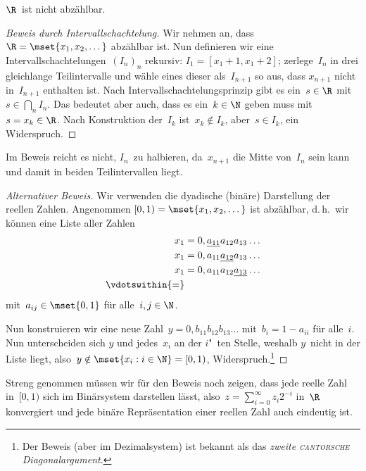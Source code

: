 \documentclass[a4paper]{article}
\begin{document}
\begin{theorem}
    $\R$~ist nicht abzählbar.
\end{theorem}

\begin{proof}[Beweis durch Intervallschachtelung]
    Wir nehmen an, dass~$\R = \mset{x_1, x_2, \dots}$ abzählbar ist. Nun definieren wir eine Intervallschachtelungen~$(I_n)_n$ rekursiv: $I_1 = [x_1+1, x_1+2]$; zerlege~$I_n$ in drei gleichlange Teilintervalle und wähle eines dieser als~$I_{n+1}$ so aus, dass $x_{n+1}$ nicht in~$I_{n+1}$ enthalten ist. Nach Intervallschachtelungsprinzip gibt es ein~$s \in \R$ mit~$s \in \bigcap_n I_n$. Das bedeutet aber auch, dass es ein~$k \in \N$ geben muss mit $s = x_k \in \R$. Nach Konstruktion der~$I_k$ ist~$x_k \notin I_k$, aber~$s \in I_k$, ein Widerspruch.
\end{proof}

Im Beweis reicht es nicht, $I_n$~zu halbieren, da~$x_{n+1}$ die Mitte von~$I_n$ sein kann und damit in beiden Teilintervallen liegt.

\begin{proof}[Alternativer Beweis]
    Wir verwenden die dyadische (binäre) Darstellung der reellen Zahlen. Angenommen $[0, 1) = \mset{x_1, x_2, \dots}$ ist abzählbar, d.\,h.\ wir können eine Liste aller Zahlen
    \begin{align*}
        x_1 & = 0,\underline{a_{11}}a_{12}a_{13}\dots \\
        x_1 & = 0,a_{11}\underline{a_{12}}a_{13}\dots \\
        x_1 & = 0,a_{11}a_{12}\underline{a_{13}}\dots \\
        \vdotswithin{=}
    \end{align*}
    mit~$a_{ij} \in \mset{0, 1}$ für alle~$i, j \in \N$.

    Nun konstruieren wir eine neue Zahl~$y = 0,b_{11}b_{12}b_{13}\dots$ mit~$b_i = 1-a_{ii}$ für alle~$i$. Nun unterscheiden sich $y$ und jedes~$x_i$ an der $i$"~ten Stelle, weshalb $y$~nicht in der Liste liegt, also~$y \notin \mset{x_i : i \in \N} = [0, 1)$, Widerspruch.\footnote{Der Beweis (aber im Dezimalsystem) ist bekannt als das \emph{zweite \textsc{cantorsche} Diagonalargument}.}
\end{proof}

\begin{remark}
    Streng genommen müssen wir für den Beweis noch zeigen, dass jede reelle Zahl in~$[0, 1)$ sich im Binärsystem darstellen lässt, also~$z = \sum_{i=0}^\infty z_i 2^{-i}$ in~$\R$ konvergiert und jede binäre Repräsentation einer reellen Zahl auch eindeutig ist.
\end{remark}
\end{document}

